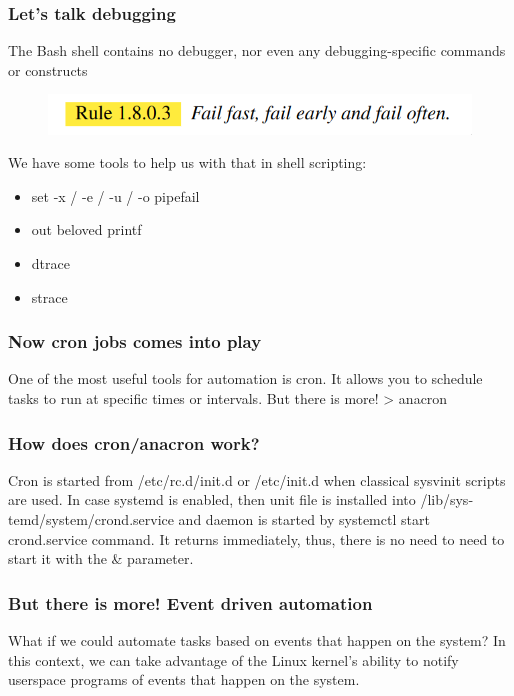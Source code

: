 \documentclass{beamer}
\begin{document}
\begin{frame}
    \frametitle{Let's talk debugging}
    \footnotesize
    The Bash shell contains no debugger, nor even any debugging-specific commands or constructs
    \begin{figure}

        \includegraphics[width=0.6\linewidth, left]{fail}

        \label{fig:fail}

    \end{figure}
    We have some tools to help us with that in shell scripting:
    \begin{itemize}
        \item set -x / -e / -u / -o pipefail
        \item out beloved printf
        \item dtrace
        \item strace
    \end{itemize}
\end{frame}

\begin{frame}
\frametitle{Now cron jobs comes into play}
\small
    One of the most useful tools for automation is cron. \newline
    It allows you to schedule tasks to run at specific times or intervals. \newline
    But there is more! \newline
    \large > anacron
\end{frame}

\begin{frame}
    \frametitle{How does cron/anacron work?}
    \small
    Cron is started from /etc/rc.d/init.d or /etc/init.d when classical sysvinit scripts are used. In case systemd is enabled, then unit file is installed into /lib/sys‐
       temd/system/crond.service and daemon is started by systemctl start crond.service command. It returns immediately, thus, there is no need to need to start it with  the
       \& parameter.
\end{frame}

\begin{frame}
\frametitle{But there is more! Event driven automation}
\small
    What if we could automate tasks based on events that happen on the system? \newline
    \pause
    In this context, we can take advantage of the Linux kernel's ability to
    notify userspace programs of events that happen on the system. \newline
\end{frame}
\end{document}
